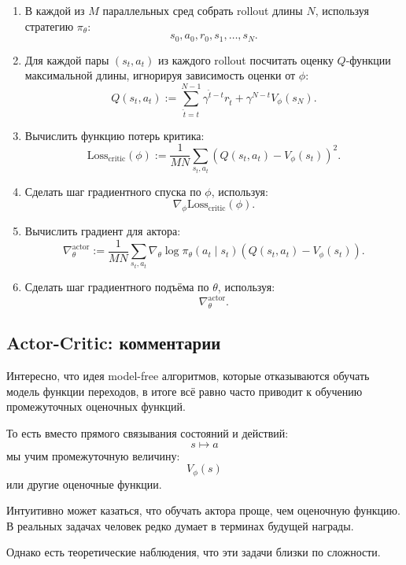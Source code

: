 \documentclass[12pt,a4paper]{article}
\begin{document}
\begin{enumerate}
    \item В каждой из $M$ параллельных сред собрать rollout длины $N$, используя стратегию $\pi_\theta$:
    \[
    s_0,a_0,r_0,s_1,\ldots,s_N.
    \]

    \item Для каждой пары $(s_t,a_t)$ из каждого rollout посчитать оценку $Q$-функции максимальной длины, игнорируя зависимость оценки от $\phi$:
    \[
    Q(s_t,a_t)
    :=
    \sum_{\hat t=t}^{N-1}
    \gamma^{\hat t-t}
    r_{\hat t}
    +
    \gamma^{N-t}
    V_\phi(s_N).
    \]

    \item Вычислить функцию потерь критика:
    \[
    \mathrm{Loss}_{\mathrm{critic}}(\phi)
    :=
    \frac{1}{MN}
    \sum_{s_t,a_t}
    \left(
    Q(s_t,a_t)
    -
    V_\phi(s_t)
    \right)^2.
    \]

    \item Сделать шаг градиентного спуска по $\phi$, используя:
    \[
    \nabla_\phi
    \mathrm{Loss}_{\mathrm{critic}}(\phi).
    \]

    \item Вычислить градиент для актора:
    \[
    \nabla_{\theta}^{\mathrm{actor}}
    :=
    \frac{1}{MN}
    \sum_{s_t,a_t}
    \nabla_\theta
    \log \pi_\theta(a_t\mid s_t)
    \left(
    Q(s_t,a_t)
    -
    V_\phi(s_t)
    \right).
    \]

    \item Сделать шаг градиентного подъёма по $\theta$, используя:
    \[
    \nabla_{\theta}^{\mathrm{actor}}.
    \]
\end{enumerate}

\subsection{Actor-Critic: комментарии}

Интересно, что идея model-free алгоритмов, которые отказываются обучать модель функции переходов, в итоге всё равно часто приводит к обучению промежуточных оценочных функций.

То есть вместо прямого связывания состояний и действий:
\[
s \mapsto a
\]
мы учим промежуточную величину:
\[
V_\phi(s)
\]
или другие оценочные функции.

Интуитивно может казаться, что обучать актора проще, чем оценочную функцию. В реальных задачах человек редко думает в терминах будущей награды.

Однако есть теоретические наблюдения, что эти задачи близки по сложности.
\end{document}
